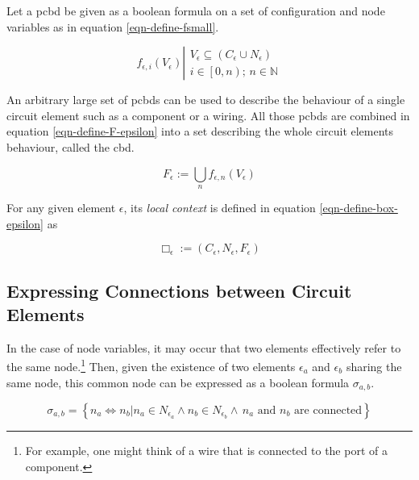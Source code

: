 	Let a \gls{pcbd} be given as a boolean formula on a set of configuration and node variables as in equation \ref{eqn-define-fsmall}.

	\begin{equation}
		\label{eqn-define-fsmall}
			f_{\epsilon, i}\left( V_\epsilon \right)
		\left|
			\begin{array}{l}
			V_\epsilon \subseteq \left( C_\epsilon \cup N_\epsilon \right) \\
			i \in \left[0,n\right); \, n \in \mathbb{N}
			\end{array}
		\right.
	\end{equation}

	An arbitrary large set of \glspl{pcbd} can be used to describe the behaviour of a single circuit element such as a component or a wiring.
	All those \glspl{pcbd} are combined in equation \ref{eqn-define-F-epsilon} into a set describing the whole circuit elements behaviour, called the \gls{cbd}.
	
	\begin{equation}
		\label{eqn-define-F-epsilon}
			F_\epsilon := \bigcup_n f_{\epsilon, n} \left( V_\epsilon \right)
	\end{equation}	
	
	For any given element $\epsilon$, its \emph{local context} is defined in equation \ref{eqn-define-box-epsilon} as
	
	\begin{equation}
		\label{eqn-define-box-epsilon}
		\Box_\epsilon := \left(C_\epsilon, N_\epsilon, F_\epsilon \right)
	\end{equation}
	
\subsection{Expressing Connections between Circuit Elements}
	In the case of node variables, it may occur that two elements effectively refer to the same node.\footnote{
		For example, one might think of a wire that is connected to the port of a component.	
	}
	Then, given the existence of two elements $\epsilon_a$ and $\epsilon_b$ sharing the same node, this common node can be expressed as a boolean formula $\sigma_{a, b}$. 
	
	\begin{equation}
	\sigma_{a, b} = 
	\left\lbrace
	n_a \Leftrightarrow n_b
	\vert
		n_a \in N_{\epsilon_a} \wedge 
		n_b \in N_{\epsilon_b} \wedge 
		\, \text{$n_a$ and $n_b$ are connected}
	\right\rbrace
	\label{eqn-define-sigma}
	\end{equation}
	
